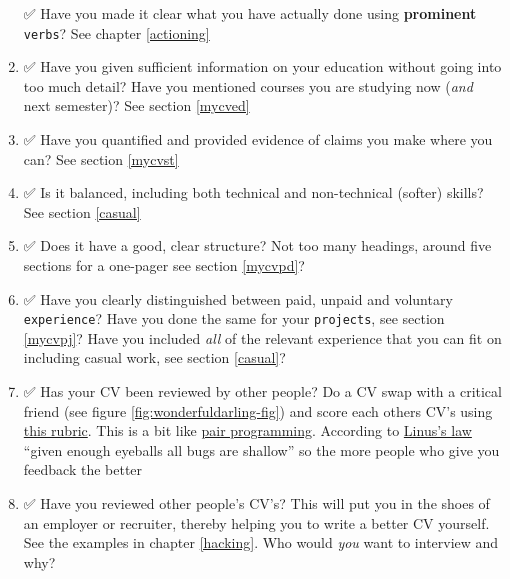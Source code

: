 \documentclass[
]{book}
\begin{document}
\begin{enumerate}
  ✅ Have you made it clear what you have actually done using \textbf{prominent} \texttt{verbs}? See chapter \ref{actioning}
\item
  ✅ Have you given sufficient information on your education without going into too much detail? Have you mentioned courses you are studying now (\emph{and} next semester)? See section \ref{mycved}
\item
  ✅ Have you quantified and provided evidence of claims you make where you can? See section \ref{mycvst}
\item
  ✅ Is it balanced, including both technical and non-technical (softer) skills? See section \ref{casual}
\item
  ✅ Does it have a good, clear structure? Not too many headings, around five sections for a one-pager see section \ref{mycvpd}?
\item
  ✅ Have you clearly distinguished between paid, unpaid and voluntary \texttt{experience}? Have you done the same for your \texttt{projects}, see section \ref{mycvpj}? Have you included \emph{all} of the relevant experience that you can fit on including casual work, see section \ref{casual}?
\item
  ✅ Has your CV been reviewed by other people? Do a CV swap with a critical friend (see figure \ref{fig:wonderfuldarling-fig}) and score each others CV's using \href{https://www.cdyf.me/CV-rubric.pdf}{this rubric}. This is a bit like \href{https://en.wikipedia.org/wiki/Pair_programming}{pair programming}. According to \href{https://en.wikipedia.org/wiki/Linus\%27s_law}{Linus's law} ``given enough eyeballs all bugs are shallow'' \citep{Raymond1999} so the more people who give you feedback the better
\item
  ✅ Have you reviewed other people's CV's? This will put you in the shoes of an employer or recruiter, thereby helping you to write a better CV yourself. See the examples in chapter \ref{hacking}. Who would \emph{you} want to interview and why?
\end{enumerate}
\end{document}
